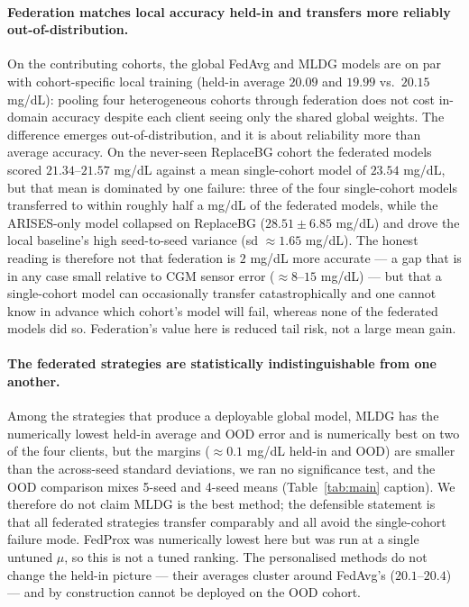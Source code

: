 \documentclass[10pt,letterpaper]{article}
\begin{document}
\paragraph{Federation matches local accuracy held-in and transfers more reliably
out-of-distribution.} On the contributing cohorts, the global FedAvg and MLDG
models are on par with cohort-specific local training (held-in average $20.09$
and $19.99$ vs.\ $20.15$ mg/dL): pooling four heterogeneous cohorts through
federation does not cost in-domain accuracy despite each client seeing only the
shared global weights. The difference emerges out-of-distribution, and it is
about reliability more than average accuracy. On the never-seen ReplaceBG cohort
the federated models scored $21.34$--$21.57$ mg/dL against a mean single-cohort
model of $23.54$ mg/dL, but that mean is dominated by one failure: three of the
four single-cohort models transferred to within roughly half a mg/dL of the
federated models, while the ARISES-only model collapsed on ReplaceBG
($28.51 \pm 6.85$ mg/dL) and drove the local baseline's high seed-to-seed
variance (sd $\approx 1.65$ mg/dL). The honest reading is therefore not that
federation is $2$ mg/dL more accurate --- a gap that is in any case small
relative to CGM sensor error ($\approx 8$--$15$ mg/dL) --- but that a
single-cohort model can occasionally transfer catastrophically and one cannot
know in advance which cohort's model will fail, whereas none of the federated
models did so. Federation's value here is reduced tail risk, not a large mean
gain.

\paragraph{The federated strategies are statistically indistinguishable from one
another.} Among the strategies that produce a deployable global model, MLDG has
the numerically lowest held-in average and OOD error and is numerically best on
two of the four clients, but the margins ($\approx 0.1$ mg/dL held-in and OOD)
are smaller than the across-seed standard deviations, we ran no significance
test, and the OOD comparison mixes 5-seed and 4-seed means (Table~\ref{tab:main}
caption). We therefore do not claim MLDG is the best method; the defensible
statement is that all federated strategies transfer comparably and all avoid the
single-cohort failure mode. FedProx was numerically lowest here but was run at a
single untuned $\mu$, so this is not a tuned ranking. The personalised methods do
not change the held-in picture --- their averages cluster around FedAvg's
($20.1$--$20.4$) --- and by construction cannot be deployed on the OOD cohort.
\end{document}
